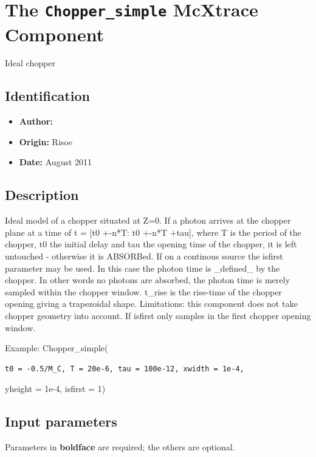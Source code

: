 \section{The \texttt{Chopper\_simple} McXtrace Component}
Ideal chopper

\subsection*{Identification}
\begin{itemize}
  \item \textbf{Author:} 
  \item \textbf{Origin:} Risoe
  \item \textbf{Date:} August 2011
\end{itemize}

\subsection*{Description}
Ideal model of a chopper situated at Z=0. If a photon arrives at the chopper plane at a time of t = [t0 +-n*T: t0 +-n*T +tau], where T is the period of the chopper, t0 the initial delay and tau the opening time of the chopper, it is left untouched - otherwise it is ABSORBed. If on a continous source the isfirst parameter may be used. In this case the photon time is \_defined\_ by the chopper. In other words no photons are absorbed, the photon time is merely sampled within the chopper window. t\_rise is the rise-time of the chopper opening giving a trapezoidal shape. Limitations: this component does not take chopper geometry into account. If isfirst only samples in the first chopper opening window.

Example: Chopper\_simple(

\begin{verbatim}
t0 = -0.5/M_C, T = 20e-6, tau = 100e-12, xwidth = 1e-4,
\end{verbatim}

yheight = 1e-4, isfirst = 1)

\subsection*{Input parameters}
Parameters in \textbf{boldface} are required; the others are optional.

